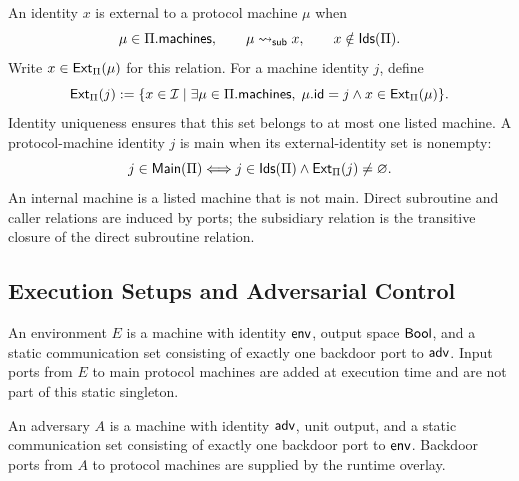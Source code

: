 \begin{definition}
\label{def:uc-main-internal-external}
\leanok
An identity \(x\) is external to a protocol machine \(\mu\) when
\[
  \mu\in\Pi.\mathsf{machines},
  \qquad
  \mu\leadsto_{\mathsf{sub}}x,
  \qquad
  x\notin\mathsf{Ids}(\Pi).
\]
Write \(x\in\mathsf{Ext}_\Pi(\mu)\) for this relation.  For a machine identity
\(j\), define
\[
  \mathsf{Ext}_\Pi(j):=
  \{x\in\mathcal{I}\mid
    \exists\mu\in\Pi.\mathsf{machines},\;
      \mu.\mathsf{id}=j\land x\in\mathsf{Ext}_\Pi(\mu)\}.
\]
Identity uniqueness ensures that this set belongs to at most one listed
machine.  A protocol-machine identity \(j\) is main when its external-identity
set is nonempty:
\[
  j\in\mathsf{Main}(\Pi)
  \Longleftrightarrow
  j\in\mathsf{Ids}(\Pi)\land\mathsf{Ext}_\Pi(j)\ne\varnothing.
\]
An internal machine is a listed machine that is not main.  Direct
subroutine and caller relations are induced by ports; the subsidiary relation
is the transitive closure of the direct subroutine relation.
\end{definition}

\subsection{Execution Setups and Adversarial Control}

\begin{definition}[Environment]
\label{def:uc-environment}
\leanok
An environment \(E\) is a machine with identity \(\mathsf{env}\), output space
\(\mathsf{Bool}\), and a static communication set consisting of exactly one backdoor
port to \(\mathsf{adv}\).  Input ports from \(E\) to main protocol machines are added
at execution time and are not part of this static singleton.
\end{definition}

\begin{definition}[Adversary]
\label{def:uc-adversary}
\leanok
An adversary \(A\) is a machine with identity \(\mathsf{adv}\), unit output, and a
static communication set consisting of exactly one backdoor port to \(\mathsf{env}\).
Backdoor ports from \(A\) to protocol machines are supplied by the runtime
overlay.
\end{definition}


